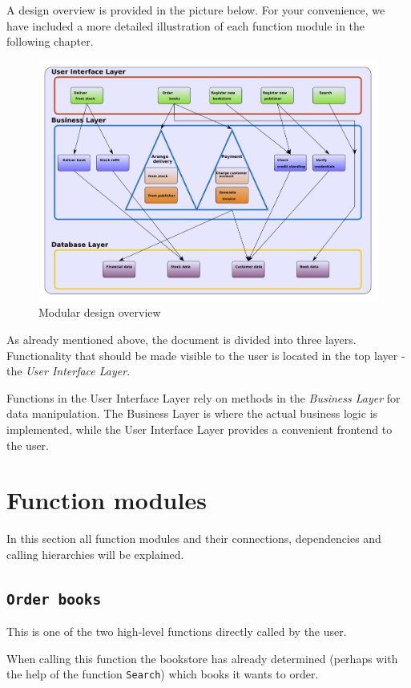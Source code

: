 A design overview is provided in the picture below. For your convenience, we have included a more detailed illustration of each function module in the following chapter.

\begin{figure}[htb]
\centering
\includegraphics[scale=0.70,angle=270]{Modular_design.png}
\caption{Modular design overview}
\end{figure}

As already mentioned above, the document is divided into three layers. Functionality that should be made visible to the user is located in the top layer - the \emph{User Interface Layer}.

Functions in the User Interface Layer rely on methods in the \emph{Business Layer} for data manipulation. The Business Layer is where the actual business logic is implemented, while the User Interface Layer provides a convenient frontend to the user.
\chapter{Function modules}
In this section all function modules and their connections, dependencies and calling hierarchies will be explained.

\section{\texttt{Order books}}
This is one of the two high-level functions directly called by the user.

When calling this function the bookstore has already determined (perhaps with the help of the function \texttt{Search})
which books it wants to order.

